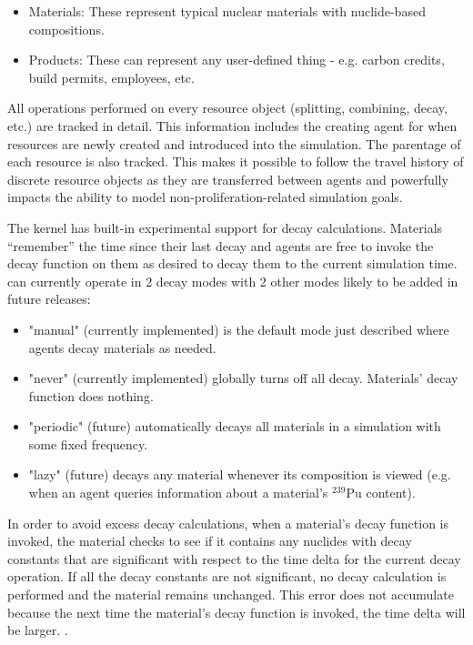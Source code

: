 \begin{itemize}

  \item Materials: These represent typical nuclear materials with
      nuclide-based compositions.

  \item Products: These can represent any user-defined thing - e.g. carbon
      credits, build permits, employees, etc.

\end{itemize}

All operations performed on every resource object (splitting, combining,
decay, etc.) are tracked in detail.  This information includes the creating
agent for when resources are newly created and introduced into the simulation.
The parentage of each resource is also tracked. This makes it possible to
follow the travel history of discrete resource objects as they are transferred
between agents and powerfully impacts the ability to model 
non-proliferation-related simulation goals. 

The \Cyclus kernel has built-in experimental support for decay calculations.
Materials ``remember'' the time since their last decay and agents are free to
invoke the decay function on them as desired to decay them to the current
simulation time. \Cyclus can currently operate in 2 decay modes with 2 other
modes likely to be added in future releases:

\begin{itemize}

    \item "manual" (currently implemented) is the default mode just described
        where agents decay materials as needed.

    \item "never" (currently implemented) globally turns off all decay.
        Materials' decay function does nothing.

    \item "periodic" (future) automatically decays all materials in a
        simulation with some fixed frequency.

    \item "lazy" (future) decays any material whenever its composition is
        viewed (e.g. when an agent queries information about a material's
        $^{239}$Pu content).

\end{itemize}

In order to avoid excess decay calculations, when a material's decay function
is invoked, the material checks to see if it contains any nuclides with decay
constants that are significant with respect to the time delta for the current
decay operation.  If all the decay constants are not significant, no decay
calculation is performed and the material remains unchanged.  This error does
not accumulate because the next time the material's decay function is invoked,
the time delta will be larger. 
.

